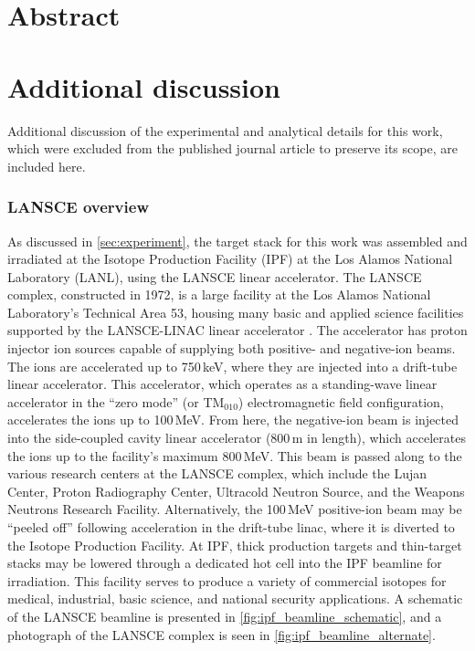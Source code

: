 % 
% 
\section{Abstract}



% 
% 



% 
% 



\section{Additional discussion}


Additional discussion of the experimental and analytical details for this work, which were excluded from the published journal article to preserve its scope, are included here.

\subsubsection{LANSCE overview}


As discussed in \autoref{sec:experiment}, the target stack for this work was assembled and irradiated at the Isotope Production Facility (IPF) at the Los Alamos National Laboratory (LANL), using the LANSCE linear accelerator. 
The LANSCE complex, constructed in 1972, is a large facility at the Los Alamos National Laboratory's Technical Area 53, housing many basic and applied science facilities supported by the LANSCE-LINAC linear accelerator \cite{Lisowski2006}.
The accelerator has proton injector ion sources capable of supplying both positive- and negative-ion beams.
The ions are accelerated up to 750\,keV, where they are injected into a drift-tube linear accelerator.
This accelerator, which operates as a standing-wave linear accelerator in the \enquote{zero mode} (or TM$_{010}$) electromagnetic field configuration, accelerates the ions up to 100\,MeV.  
From here, the negative-ion beam is injected into the side-coupled cavity linear accelerator (800\,m in length), which accelerates the ions up to the facility's maximum 800\,MeV.
This beam is passed along to the various research centers at the LANSCE complex, which include the Lujan Center, Proton Radiography Center, Ultracold Neutron Source, and the Weapons Neutrons Research Facility.
Alternatively, the 100\,MeV positive-ion beam may be \enquote{peeled off} following acceleration in the drift-tube linac, where it is diverted to the Isotope Production Facility.
At IPF, thick production targets and thin-target stacks may be lowered through a dedicated hot cell into the IPF beamline for irradiation.
This facility serves to produce a variety of commercial isotopes for  medical, industrial, basic science, and national security applications.
A schematic of the LANSCE beamline is presented in \autoref{fig:ipf_beamline_schematic}, and a photograph of the LANSCE complex is seen in \autoref{fig:ipf_beamline_alternate}.

